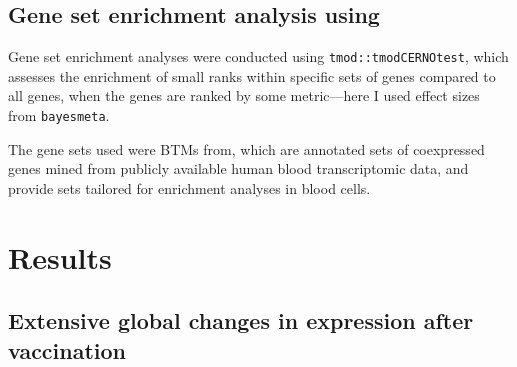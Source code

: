 \subsection{Gene set enrichment analysis using }

Gene set enrichment analyses were conducted using \texttt{tmod::tmodCERNOtest}\autocite{weiner3rd2016TmodPackageGeneral}, which assesses the enrichment of small ranks within specific sets of genes compared to all genes, when the genes are ranked by some metric---here I used effect sizes from \texttt{bayesmeta}.
%



The gene sets used were \glspl{BTM} from\autocite{li2013MolecularSignaturesAntibody}, which are annotated sets of coexpressed genes mined from publicly available human blood transcriptomic data, and provide sets tailored for enrichment analyses in blood cells.


\section{Results}

\subsection{Extensive global changes in expression after vaccination}

